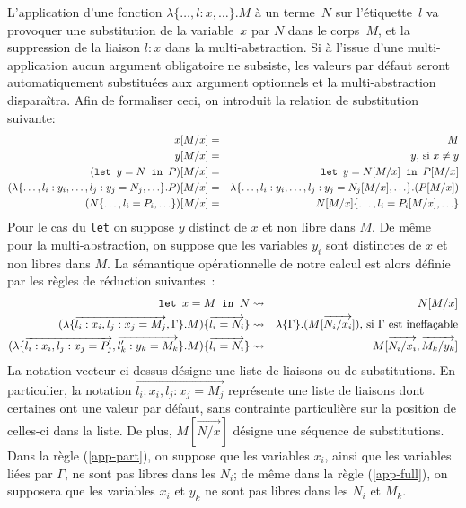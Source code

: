 \documentclass[twoside]{article}
\newcommand{\letin}[3]{\text{\texttt{let }} #1 = #2 \text{\texttt{ in }} #3}
\renewcommand{\vec}[1]{\overrightarrow{#1}}
\theoremstyle{plain}
\theoremstyle{definition}
\theoremstyle{remark}
\begin{document}
L'application d'une fonction $\lambda\{\ldots,l:x,\ldots\}.M$ à un terme~$N$ sur
l'étiquette~$l$ va provoquer une substitution de la variable~$x$ par $N$ dans le
corps~$M$, et la suppression de la liaison $l:x$ dans la multi-abstraction. Si à
l'issue d'une multi-application aucun argument obligatoire ne subsiste, les
valeurs par défaut seront automatiquement substituées aux argument optionnels et
la multi-abstraction disparaîtra. Afin de formaliser ceci,
on introduit la relation de substitution suivante:
\begin{eqnarray*}
  x[M/x] &=& M \\
  y[M/x] &=& y \text{, si $x\neq y$} \\
  (\letin{y}{N}{P})[M/x] &=& \letin{y}{N[M/x]}{P[M/x]} \\
  (\lambda \{ \ldots, l_i:y_i,\ldots,l_j:y_j=N_j, \ldots \}. P)[M/x] &=&
  \lambda \{ \ldots, l_i:y_i,\ldots, l_j:y_j=N_j[M/x], \ldots \}. (P[M/x])
  \label{rule:subst-abs} \\
  (N\{ \ldots, l_i=P_i, \ldots\})[M/x] &=& N[M/x]\{\ldots, l_i=P_i[M/x],\ldots \}
\end{eqnarray*}
Pour le cas du \verb.let. on suppose $y$ distinct de $x$ et non libre dans $M$.
De même pour la multi-abstraction, on suppose que les variables $y_i$ sont
distinctes de $x$ et non libres dans $M$. La sémantique opérationnelle de
notre calcul est alors définie par les règles de réduction suivantes~:
\begin{eqnarray}
 \letin{x}{M}{N} &\leadsto& N[M/x] \\
 (\lambda\{\vec{l_i:x_i,l_j:x_j=M_j},\Gamma\}.M)\{\vec{l_i=N_i}\}
   &\leadsto&
   \lambda\{\Gamma\}.(M[\vec{N_i/x_i}])
   \mbox{, si $\Gamma$ est ineffaçable}\label{app-part} \\
   (\lambda\{\vec{l_i:x_i,l_j:x_j=P_j},\vec{l'_k:y_k=M_k}\}.M)\{\vec{l_i=N_i}\}
   &\leadsto&
   M[\vec{N_i/x_i},\vec{M_k/y_k}] \label{app-full}
\end{eqnarray}
La notation vecteur ci-dessus désigne une liste de liaisons ou de 
substitutions. En particulier,
la notation $\vec{l_i:x_i,l_j:x_j=M_j}$ représente une liste de liaisons
dont certaines ont une valeur par défaut, sans contrainte particulière sur la 
position de celles-ci dans la liste.
De plus, $M[\vec{N/x}]$ désigne une séquence de substitutions.
Dans la règle (\ref{app-part}), on suppose que les variables $x_i$,
ainsi que les variables liées par $\Gamma$, ne sont pas libres dans les $N_i$;
de même dans la règle (\ref{app-full}), on supposera que les variables
$x_i$ et $y_k$ ne sont pas libres dans les $N_i$ et $M_k$.
\end{document}
